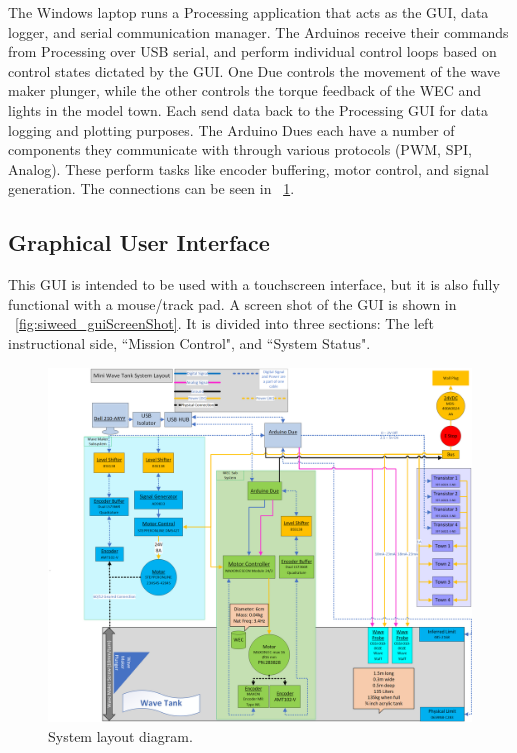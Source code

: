 \documentclass[hardware,article,submit,pdftex,moreauthors]{Definitions/mdpi}
\begin{document}
The Windows laptop runs a Processing application that acts as the GUI, data logger, and serial communication manager.
The Arduinos receive their commands from Processing over USB serial, and perform individual control loops based on control states dictated by the GUI.
One Due controls the movement of the wave maker plunger, while the other controls the torque feedback of the WEC and lights in the model town.
Each send data back to the Processing GUI for data logging and plotting purposes.
The Arduino Dues each have a number of components they communicate with through various protocols (PWM, SPI, Analog).
These perform tasks like encoder buffering, motor control, and signal generation.
The connections can be seen in \figurename~\ref{fig:siweed_layout}.

\subsection{Graphical User Interface}
This GUI is intended to be used with a touchscreen interface, but it is also fully functional with a mouse/track pad.
A screen shot of the GUI is shown in \figurename~\ref{fig:siweed_guiScreenShot}.
It is divided into three sections: The left instructional side, ``Mission Control", and ``System Status".

\begin{figure}[tb]
  \centering
  \includegraphics[width=1\textwidth]{diagrams/SystemLayout.png}
  \caption{System layout diagram.}
  \label{fig:siweed_layout}
\end{figure}
\end{document}
